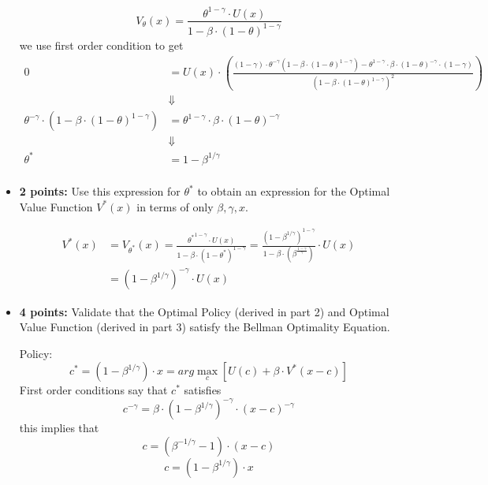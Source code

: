 \documentclass[12pt]{exam}
\begin{document}
\begin{questions}
\begin{itemize}
\begin{solution}
\[V_{\theta}(x) = \frac{\theta^{1-\gamma} \cdot U(x)} {1 - \beta \cdot (1 - \theta)^{1-\gamma}}\]
we use first order condition to get 
    \begin{align*}
        0 &= U(x) \cdot (\frac{(1-\gamma) \cdot \theta^{-\gamma}(1 - \beta \cdot (1-\theta)^{1-\gamma}) - \theta^{1-\gamma} \cdot \beta \cdot (1-\theta)^{-\gamma} \cdot (1-\gamma)}{(1 - \beta \cdot (1-\theta)^{1-\gamma})^2}) \\
        &\Downarrow\\
        \theta^{-\gamma} \cdot (1 - \beta \cdot (1-\theta)^{1-\gamma}) &= \theta^{1-\gamma}\cdot \beta \cdot (1-\theta)^{-\gamma} \\
        &\Downarrow\\
        \theta^* &= 1 - \beta^{1/\gamma} \\
    \end{align*}

\end{solution}

\item {\bf 2 points: } Use this expression for $\theta^*$ to obtain an expression for the Optimal Value Function $V^*(x)$ in terms of only $\beta, \gamma, x$.\\

\begin{solution}
    \begin{align*}
        V^*(x) &= V_{\theta^*}(x) = \frac{{\theta^*}^{1-\gamma} \cdot U(x)} {1 - \beta \cdot (1 - \theta^*)^{1-\gamma}} =  \frac{(1 - \beta^{1/\gamma})^{1-\gamma}} {1 - \beta \cdot (\beta^{\frac{1-\gamma}{\gamma}})} \cdot U(x)\\
        &= (1-\beta^{1/\gamma})^{-\gamma} \cdot U(x)
    \end{align*}
\end{solution}

\item {\bf 4 points: } Validate that the Optimal Policy (derived in part 2) and Optimal Value Function (derived in part 3) satisfy the Bellman Optimality Equation.\\

\begin{solution}
    Policy: 
    \[c^* = (1 - \beta^{1/\gamma}) \cdot x = arg\max_c[U(c) + \beta \cdot V^*(x - c)]\]
    First order conditions say that $c^*$ satisfies
    \[c^{-\gamma} = \beta \cdot (1-\beta^{1/\gamma})^{-\gamma} \cdot (x - c)^{-\gamma}\]
    this implies that 
    \[c = (\beta^{-1/\gamma}-1) \cdot (x - c)\]
    \[c = (1 - \beta^{1/\gamma}) \cdot x\]
    

\end{solution}
\end{itemize}
\end{questions}
\end{document}
